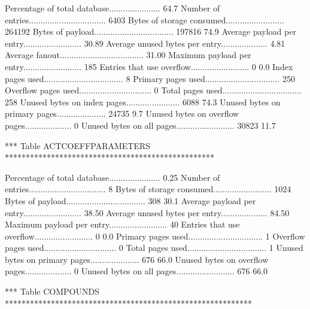 Percentage of total database......................  64.7%
Number of entries................................. 6403      
Bytes of storage consumed......................... 264192    
Bytes of payload.................................. 197816      74.9%
Average payload per entry......................... 30.89     
Average unused bytes per entry.................... 4.81      
Average fanout.................................... 31.00     
Maximum payload per entry......................... 185       
Entries that use overflow......................... 0            0.0%
Index pages used.................................. 8         
Primary pages used................................ 250       
Overflow pages used............................... 0         
Total pages used.................................. 258       
Unused bytes on index pages....................... 6088        74.3%
Unused bytes on primary pages..................... 24735        9.7%
Unused bytes on overflow pages.................... 0         
Unused bytes on all pages......................... 30823       11.7%

*** Table ACTCOEFFPARAMETERS **************************************************

Percentage of total database......................   0.25%
Number of entries................................. 8         
Bytes of storage consumed......................... 1024      
Bytes of payload.................................. 308         30.1%
Average payload per entry......................... 38.50     
Average unused bytes per entry.................... 84.50     
Maximum payload per entry......................... 40        
Entries that use overflow......................... 0            0.0%
Primary pages used................................ 1         
Overflow pages used............................... 0         
Total pages used.................................. 1         
Unused bytes on primary pages..................... 676         66.0%
Unused bytes on overflow pages.................... 0         
Unused bytes on all pages......................... 676         66.0%

*** Table COMPOUNDS ***********************************************************


